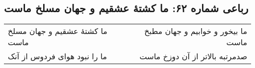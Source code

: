 \begin{center}
\section*{رباعی شماره ۶۲: ما کشتهٔ عشقیم و جهان مسلخ ماست}
\label{sec:sh062}
\begin{longtable}{l p{0.5cm} r}
ما کشتهٔ عشقیم و جهان مسلخ ماست
&&
ما بیخور و خوابیم و جهان مطبخ ماست
\\
ما را نبود هوای فردوس از آنک
&&
صدمرتبه بالاتر از آن دوزخ ماست
\\
\end{longtable}
\end{center}
